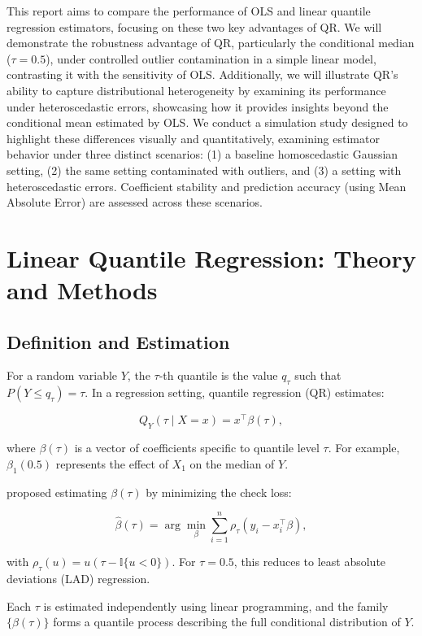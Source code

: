 \documentclass[fleqn,10pt]{latex/stylish_article} %
\begin{document}
This report aims to compare the performance of OLS and linear quantile regression estimators, focusing on these two key advantages of QR. We will demonstrate the robustness advantage of QR, particularly the conditional median (\(\tau=0.5\)), under controlled outlier contamination in a simple linear model, contrasting it with the sensitivity of OLS. Additionally, we will illustrate QR's ability to capture distributional heterogeneity by examining its performance under heteroscedastic errors, showcasing how it provides insights beyond the conditional mean estimated by OLS. We conduct a simulation study designed to highlight these differences visually and quantitatively, examining estimator behavior under three distinct scenarios: (1) a baseline homoscedastic Gaussian setting, (2) the same setting contaminated with outliers, and (3) a setting with heteroscedastic errors. Coefficient stability and prediction accuracy (using Mean Absolute Error) are assessed across these scenarios.

\section{Linear Quantile Regression: Theory and Methods}\label{linear-quantile-regression-theory-and-methods}

\subsection{Definition and Estimation}\label{definition-and-estimation}

For a random variable \(Y\), the \(\tau\)-th quantile is the value \(q_\tau\) such that \(P(Y \le q_\tau) = \tau\). In a regression setting, quantile regression (QR) estimates:

\[
Q_Y(\tau \mid X = x) = x^\top \beta(\tau),
\]

where \(\beta(\tau)\) is a vector of coefficients specific to quantile level \(\tau\). For example, \(\beta_1(0.5)\) represents the effect of \(X_1\) on the median of \(Y\).

\citet{Koenker1978} proposed estimating \(\beta(\tau)\) by minimizing the check loss:

\[
\hat\beta(\tau) = \arg\min_\beta \sum_{i=1}^n \rho_\tau(y_i - x_i^\top \beta),
\]

with \(\rho_\tau(u) = u(\tau - \mathbb{I}\{u < 0\})\). For \(\tau = 0.5\), this reduces to least absolute deviations (LAD) regression.

Each \(\tau\) is estimated independently using linear programming, and the family \(\{\beta(\tau)\}\) forms a quantile process describing the full conditional distribution of \(Y\).
\end{document}
